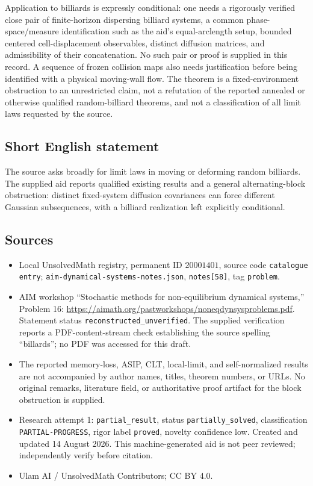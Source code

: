 \documentclass[11pt]{article}
\begin{document}
Application to billiards is expressly conditional: one needs a rigorously verified close pair of finite-horizon dispersing billiard systems, a common phase-space/measure identification such as the aid's equal-arclength setup, bounded centered cell-displacement observables, distinct diffusion matrices, and admissibility of their concatenation. No such pair or proof is supplied in this record. A sequence of frozen collision maps also needs justification before being identified with a physical moving-wall flow. The theorem is a fixed-environment obstruction to an unrestricted claim, not a refutation of the reported annealed or otherwise qualified random-billiard theorems, and not a classification of all limit laws requested by the source.
\subsection{Short English statement}
The source asks broadly for limit laws in moving or deforming random billiards. The supplied aid reports qualified existing results and a general alternating-block obstruction: distinct fixed-system diffusion covariances can force different Gaussian subsequences, with a billiard realization left explicitly conditional.
\subsection{Sources}
\begin{itemize}
\item Local UnsolvedMath registry, permanent ID \(20001401\), source code \texttt{catalogue entry}; \texttt{aim-dynamical-systems-notes.json}, \texttt{notes[58]}, tag \texttt{problem}.
\item AIM workshop ``Stochastic methods for non-equilibrium dynamical systems,'' Problem 16: \url{https://aimath.org/pastworkshops/noneqdynsysproblems.pdf}. Statement status \texttt{reconstructed\_unverified}. The supplied verification reports a PDF-content-stream check establishing the source spelling ``billards''; no PDF was accessed for this draft.
\item The reported memory-loss, ASIP, CLT, local-limit, and self-normalized results are not accompanied by author names, titles, theorem numbers, or URLs. No original remarks, literature field, or authoritative proof artifact for the block obstruction is supplied.
\item Research attempt 1: \texttt{partial\_result}, status \texttt{partially\_solved}, classification \texttt{PARTIAL-PROGRESS}, rigor label \texttt{proved}, novelty confidence low. Created and updated 14 August 2026. This machine-generated aid is not peer reviewed; independently verify before citation.
\item Ulam AI / UnsolvedMath Contributors; CC BY 4.0.
\end{itemize}
\end{document}

